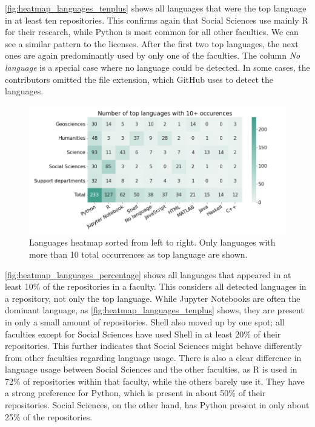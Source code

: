 

\autoref{fig:heatmap_languages_tenplus} shows all languages that were the top language in at least ten repositories. This confirms again that Social Sciences use mainly R for their research, while Python is most common for all other faculties. We can see a similar pattern to the licenses. After the first two top languages, the next ones are again predominantly used by only one of the faculties. The column \textit{No language} is a special case where no language could be detected. In some cases, the contributors omitted the file extension, which GitHub uses to detect the languages.

\begin{figure}[h!]
\centerline{
\includegraphics[scale=0.5]{figures_results/heatmap_languages_tenplus.png}}
\caption{Languages heatmap sorted from left to right. Only languages with more than 10 total occurrences as top language are shown.
\label{fig:heatmap_languages_tenplus}}
\end{figure}

\autoref{fig:heatmap_languages_percentage} shows all languages that appeared in at least 10\% of the repositories in a faculty. This considers all detected languages in a repository, not only the top language. While Jupyter Notebooks are often the dominant language, as \autoref{fig:heatmap_languages_tenplus} shows, they are present in only a small amount of repositories. Shell also moved up by one spot; all faculties except for Social Sciences have used Shell in at least 20\% of their repositories. This further indicates that Social Sciences might behave differently from other faculties regarding language usage. 
There is also a clear difference in language usage between Social Sciences and the other faculties, as R is used in 72\% of repositories within that faculty, while the others barely use it. They have a strong preference for Python, which is present in about 50\% of their repositories. Social Sciences, on the other hand, has Python present in only about 25\% of the repositories.

